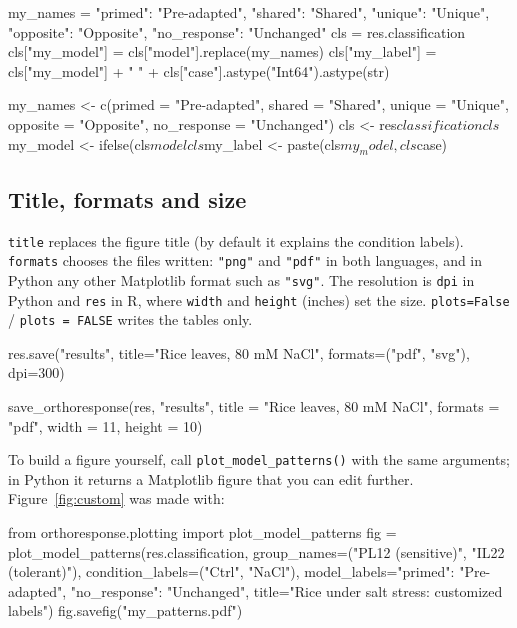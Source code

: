 \documentclass[11pt,a4paper]{article}
\newcommand{\code}[1]{\texttt{\color{navy!85!black}#1}}
\begin{document}
\begin{pycode}
my_names = {"primed": "Pre-adapted", "shared": "Shared", "unique": "Unique",
         "opposite": "Opposite", "no_response": "Unchanged"}
cls = res.classification
cls["my_model"] = cls["model"].replace(my_names)
cls["my_label"] = cls["my_model"] + " " + cls["case"].astype("Int64").astype(str)
\end{pycode}
\begin{rcode}
my_names <- c(primed = "Pre-adapted", shared = "Shared", unique = "Unique",
           opposite = "Opposite", no_response = "Unchanged")
cls <- res$classification
cls$my_model <- ifelse(cls$model %
cls$my_label <- paste(cls$my_model, cls$case)
\end{rcode}

\subsection{Title, formats and size}

\code{title} replaces the figure title (by default it explains the condition labels). \code{formats}
chooses the files written: \code{"png"} and \code{"pdf"} in both languages, and in Python any other
Matplotlib format such as \code{"svg"}. The resolution is
\code{dpi} in Python and \code{res} in R, where \code{width} and \code{height} (inches) set the size.
\code{plots=False} / \code{plots = FALSE} writes the tables only.

\begin{pycode}
res.save("results", title="Rice leaves, 80 mM NaCl", formats=("pdf", "svg"), dpi=300)
\end{pycode}
\begin{rcode}
save_orthoresponse(res, "results", title = "Rice leaves, 80 mM NaCl",
                   formats = "pdf", width = 11, height = 10)
\end{rcode}

To build a figure yourself, call \code{plot\_model\_patterns()} with the same arguments; in Python it
returns a Matplotlib figure that you can edit further. Figure~\ref{fig:custom} was made with:

\begin{pycode}
from orthoresponse.plotting import plot_model_patterns
fig = plot_model_patterns(res.classification,
        group_names=("PL12 (sensitive)", "IL22 (tolerant)"),
        condition_labels=("Ctrl", "NaCl"),
        model_labels={"primed": "Pre-adapted", "no_response": "Unchanged"},
        title="Rice under salt stress: customized labels")
fig.savefig("my_patterns.pdf")
\end{pycode}
\end{document}
